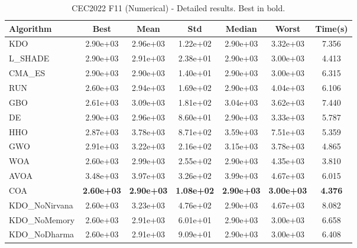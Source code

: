 \begin{table}[H]
\centering\small
\caption{CEC2022 F11 (Numerical) - Detailed results. Best in bold.}
\label{tab:cec2022_F11}
\begin{tabular}{lcccccc}
\toprule
\textbf{Algorithm} & \textbf{Best} & \textbf{Mean} & \textbf{Std} & \textbf{Median} & \textbf{Worst} & \textbf{Time(s)} \\
\midrule
KDO & 2.90e+03 & 2.96e+03 & 1.22e+02 & 2.90e+03 & 3.32e+03 & 7.356 \\
L_SHADE & 2.90e+03 & 2.91e+03 & 2.38e+01 & 2.90e+03 & 3.00e+03 & 4.413 \\
CMA_ES & 2.90e+03 & 2.90e+03 & 1.40e+01 & 2.90e+03 & 3.00e+03 & 6.315 \\
RUN & 2.60e+03 & 2.94e+03 & 1.69e+02 & 2.90e+03 & 4.04e+03 & 6.106 \\
GBO & 2.61e+03 & 3.09e+03 & 1.81e+02 & 3.04e+03 & 3.62e+03 & 7.440 \\
DE & 2.90e+03 & 2.96e+03 & 8.60e+01 & 2.90e+03 & 3.33e+03 & 5.787 \\
HHO & 2.87e+03 & 3.78e+03 & 8.71e+02 & 3.59e+03 & 7.51e+03 & 5.359 \\
GWO & 2.91e+03 & 3.22e+03 & 2.16e+02 & 3.15e+03 & 3.78e+03 & 4.865 \\
WOA & 2.60e+03 & 2.99e+03 & 2.55e+02 & 2.90e+03 & 4.35e+03 & 3.810 \\
AVOA & 3.48e+03 & 3.97e+03 & 3.26e+02 & 3.99e+03 & 4.67e+03 & 6.015 \\
COA & \textbf{2.60e+03} & \textbf{2.90e+03} & \textbf{1.08e+02} & \textbf{2.90e+03} & \textbf{3.00e+03} & \textbf{4.376} \\
KDO_NoNirvana & 2.60e+03 & 3.23e+03 & 4.76e+02 & 2.90e+03 & 4.67e+03 & 8.082 \\
KDO_NoMemory & 2.60e+03 & 2.91e+03 & 6.01e+01 & 2.90e+03 & 3.00e+03 & 6.658 \\
KDO_NoDharma & 2.60e+03 & 2.91e+03 & 9.09e+01 & 2.90e+03 & 3.00e+03 & 6.408 \\
\bottomrule
\end{tabular}
\end{table}
